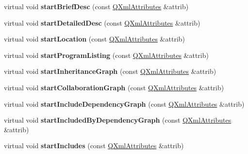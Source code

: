 \begin{DoxyCompactItemize}
virtual void {\bfseries start\+Brief\+Desc} (const \mbox{\hyperlink{class_q_xml_attributes}{Q\+Xml\+Attributes}} \&attrib)
\item 
\mbox{\label{class_compound_handler_ac35ca9b5a01a8cc6c43923a1ce4a855d}} 
virtual void {\bfseries start\+Detailed\+Desc} (const \mbox{\hyperlink{class_q_xml_attributes}{Q\+Xml\+Attributes}} \&attrib)
\item 
\mbox{\label{class_compound_handler_a4606e031f1530c54d598f4d8b201dcc8}} 
virtual void {\bfseries start\+Location} (const \mbox{\hyperlink{class_q_xml_attributes}{Q\+Xml\+Attributes}} \&attrib)
\item 
\mbox{\label{class_compound_handler_a76eb6de8397491aeea84d65bb916869e}} 
virtual void {\bfseries start\+Program\+Listing} (const \mbox{\hyperlink{class_q_xml_attributes}{Q\+Xml\+Attributes}} \&attrib)
\item 
\mbox{\label{class_compound_handler_a590044022f067bcecd4bef1c145f0441}} 
virtual void {\bfseries start\+Inheritance\+Graph} (const \mbox{\hyperlink{class_q_xml_attributes}{Q\+Xml\+Attributes}} \&attrib)
\item 
\mbox{\label{class_compound_handler_a7e62d6b114b82e2fa3b08be77b17414a}} 
virtual void {\bfseries start\+Collaboration\+Graph} (const \mbox{\hyperlink{class_q_xml_attributes}{Q\+Xml\+Attributes}} \&attrib)
\item 
\mbox{\label{class_compound_handler_a0dbc6ea9e41bd8c041f30e0b88048386}} 
virtual void {\bfseries start\+Include\+Dependency\+Graph} (const \mbox{\hyperlink{class_q_xml_attributes}{Q\+Xml\+Attributes}} \&attrib)
\item 
\mbox{\label{class_compound_handler_a5954850cd44c10f9cfbe397685d27965}} 
virtual void {\bfseries start\+Included\+By\+Dependency\+Graph} (const \mbox{\hyperlink{class_q_xml_attributes}{Q\+Xml\+Attributes}} \&attrib)
\item 
\mbox{\label{class_compound_handler_a0c8a8570442c522490f745a67b3a8ea0}} 
virtual void {\bfseries start\+Includes} (const \mbox{\hyperlink{class_q_xml_attributes}{Q\+Xml\+Attributes}} \&attrib)

\end{DoxyCompactItemize}
